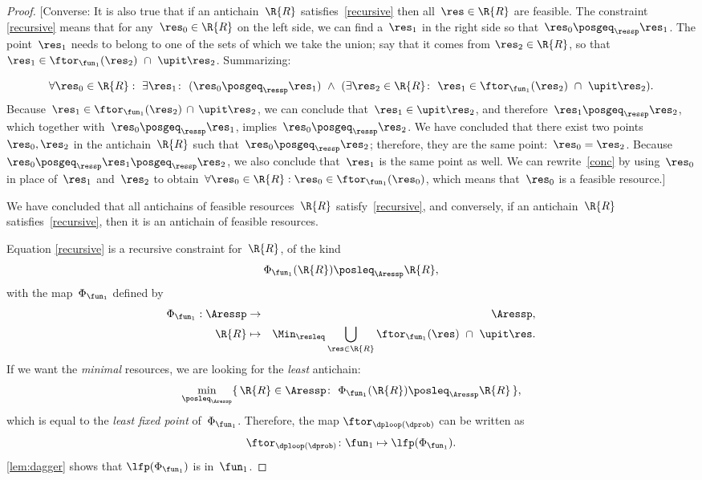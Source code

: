 \begin{proof}
{[}Converse: It is also true that if an antichain~$\R{R}$ satisfies~\eqref{recursive}
then all~$\res\in\R{R}$ are feasible. The constraint \eqref{recursive}
means that for any~$\res_{0}\in\R{R}$ on the left side, we can find
a~$\res_{1}$ in the right side so that~$\res_{0}\posgeq_{\ressp}\res_{1}$.
The point~$\res_{1}$ needs to belong to one of the sets of which
we take the union; say that it comes from $\res_{2}\in\R{R}$, so
that $\res_{1}\in\ftor_{\fun_{1}}(\res_{2})\ \cap\ \upit\res_{2}$.
Summarizing:

{\footnotesize{}
\begin{equation}
\forall\res_{0}\in\R{R}:\ \exists\res_{1}\colon\ (\res_{0}\posgeq_{\ressp}\res_{1})\ \wedge\ (\exists\res_{2}\in\R{R}\colon\ \res_{1}\in\ftor_{\fun_{1}}(\res_{2})\ \cap\ \upit\res_{2}).\label{eq:conc}
\end{equation}
}Because~$\res_{1}\in\ftor_{\fun_{1}}(\res_{2})\,\cap\,\upit\res_{2}$,
we can conclude that~$\res_{1}\in\upit\res_{2}$, and therefore~$\res_{1}\posgeq_{\ressp}\res_{2}$,
which together with~$\res_{0}\posgeq_{\ressp}\res_{1}$, implies~$\res_{0}\posgeq_{\ressp}\res_{2}$.
We have concluded that there exist two points~$\res_{0},\res_{2}$
in the antichain~$\R{R}$ such that~$\res_{0}\posgeq_{\ressp}\res_{2}$;
therefore, they are the same point:~$\res_{0}=\res_{2}$. Because~$\res_{0}\posgeq_{\ressp}\res_{1}\posgeq_{\ressp}\res_{2}$,
we also conclude that~$\res_{1}$ is the same point as well. We can
rewrite~\eqref{conc} by using~$\res_{0}$ in place of~$\res_{1}$
and~$\res_{2}$ to obtain~$\forall\res_{0}\in\R{R}:\res_{0}\in\ftor_{\fun_{1}}(\res_{0})$,
which means that~$\res_{0}$ is a feasible resource.{]}

We have concluded that all antichains of feasible resources~$\R{R}$
satisfy~\eqref{recursive}, and conversely, if an antichain~$\R{R}$
satisfies~\eqref{recursive}, then it is an antichain of feasible
resources.

Equation \eqref{recursive} is a recursive constraint for~$\R{R}$,
of the kind
\[
\Phi_{\fun_{1}}(\R{R})\posleq_{\Aressp}\R{R},
\]
with the map~$\Phi_{\fun_{1}}$ defined by
\begin{eqnarray}
\Phi_{\fun_{1}}:\Aressp & \rightarrow & \Aressp,\label{eq:bigphi}\\
\R{R} & \mapsto & \Min_{\resleq}\bigcup_{\res\in\R{R}}\ftor_{\fun_{1}}(\res)\ \cap\ \upit\res.\nonumber
\end{eqnarray}
If we want the \emph{minimal} resources, we are looking for the \emph{least}
antichain:
\[
\min_{\posleq_{\Aressp}}\{\,\R{R}\in\Aressp\colon\ \Phi_{\fun_{1}}(\R{R})\posleq_{\Aressp}\R{R}\,\},
\]
which is equal to the \emph{least fixed point }of~$\Phi_{\fun_{1}}$.
Therefore, the map $\ftor_{\dploop(\dprob)}$ can be written as
\begin{equation}
\ftor_{\dploop(\dprob)}\colon\fun_{1}\mapsto\lfp(\Phi_{\fun_{1}}).\label{eq:loop_fixpoint}
\end{equation}
\cref{lem:dagger} shows that $\lfp(\Phi_{\fun_{1}})$ is \scottcontinuous
in~$\fun_{1}$.
\end{proof}


